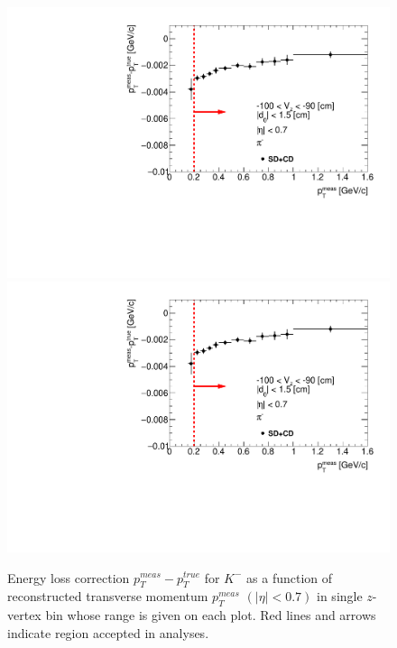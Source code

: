 \begin{figure}[hb]
\caption[Energy loss correction for $K^-$ as a function of reconstructed transverse momentum $p_T^{meas}$.]{Energy loss correction $p_T^{meas}-p_T^{true}$ for $K^-$ as a function of reconstructed transverse momentum $p_T^{meas}$ $\left(|\eta|<0.7\right)$ in single $z$-vertex bin whose range is given on each plot. Red lines and arrows indicate region accepted in analyses.}\label{fig:energyLossPrimaryK_minus}
\centering
\parbox{0.329\textwidth}{
  \centering
  \includegraphics[width=\linewidth,page=23]{graphics/energyLoss/energyLoss3D_OnePrtAlso.pdf}\\
  \includegraphics[width=\linewidth,page=26]{graphics/energyLoss/energyLoss3D_OnePrtAlso.pdf}\\
}
\end{figure}
